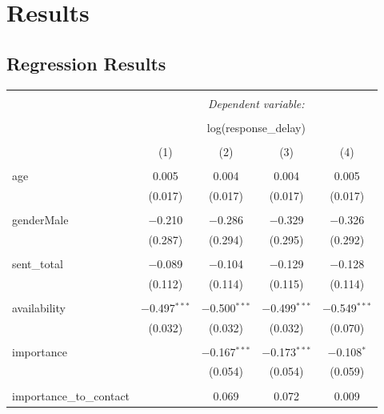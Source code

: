 \documentclass[12pt]{nuthesis}	%
\begin{document}
\section{Results}

\subsection{Regression Results}

\begin{table}[!htbp] \fontsize{7}{7.5}\selectfont \centering 
\begin{tabular}{@{\extracolsep{5pt}}lcccc} 
\\[-1.8ex]\hline 
\hline \\[-1.8ex] 
 & \multicolumn{4}{c}{\textit{Dependent variable:}} \\ 
\cline{2-5} 
\\[-1.8ex] & \multicolumn{4}{c}{log(response\_delay)} \\ 
\\[-1.8ex] & (1) & (2) & (3) & (4)\\ 
\hline \\[-1.8ex] 
 age & 0.005 & 0.004 & 0.004 & 0.005 \\ 
  & (0.017) & (0.017) & (0.017) & (0.017) \\ 
  & & & & \\ 
 genderMale & $-$0.210 & $-$0.286 & $-$0.329 & $-$0.326 \\ 
  & (0.287) & (0.294) & (0.295) & (0.292) \\ 
  & & & & \\ 
 sent\_total & $-$0.089 & $-$0.104 & $-$0.129 & $-$0.128 \\ 
  & (0.112) & (0.114) & (0.115) & (0.114) \\ 
  & & & & \\ 
 availability & $-$0.497$^{***}$ & $-$0.500$^{***}$ & $-$0.499$^{***}$ & $-$0.549$^{***}$ \\ 
  & (0.032) & (0.032) & (0.032) & (0.070) \\ 
  & & & & \\ 
 importance &  & $-$0.167$^{***}$ & $-$0.173$^{***}$ & $-$0.108$^{*}$ \\ 
  &  & (0.054) & (0.054) & (0.059) \\ 
  & & & & \\ 
 importance\_to\_contact &  & 0.069 & 0.072 & 0.009 \\ 

\end{tabular}
\end{table}
\end{document}
